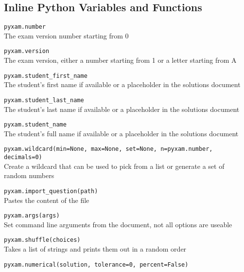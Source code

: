 \documentclass[9pt]{extarticle}
\begin{document}
\begin{multicols}{2}
\subsection*{Inline Python Variables and Functions}
\begin{description}
\item\texttt{pyxam.number} \\
    The exam version number starting from 0
    \\
\item\texttt{pyxam.version} \\
    The exam version, either a number starting from 1 or a letter starting from A
    \\
\item\texttt{pyxam.student\_first\_name} \\
    The student's first name if available or a placeholder in the solutions document
    \\
\item\texttt{pyxam.student\_last\_name} \\
    The student's last name if available or a placeholder in the solutions document
    \\
\item\texttt{pyxam.student\_name} \\
    The student's full name if available or a placeholder in the solutions document
    \\
\item\texttt{pyxam.wildcard(min=None, max=None, set=None, n=pyxam.number, decimals=0)} \\
    Create a wildcard that can be used to pick from a list or generate a set of random numbers
    \\
\item\texttt{pyxam.import\_question(path)} \\
    Pastes the content of the file
    \\
\item\texttt{pyxam.args(args)} \\
    Set command line arguments from the document, not all options are useable
    \\
\item\texttt{pyxam.shuffle(choices)} \\
    Takes a list of strings and prints them out in a random order
    \\
\item\texttt{pyxam.numerical(solution, tolerance=0, percent=False)} \\

\end{description}
\end{multicols}
\end{document}
